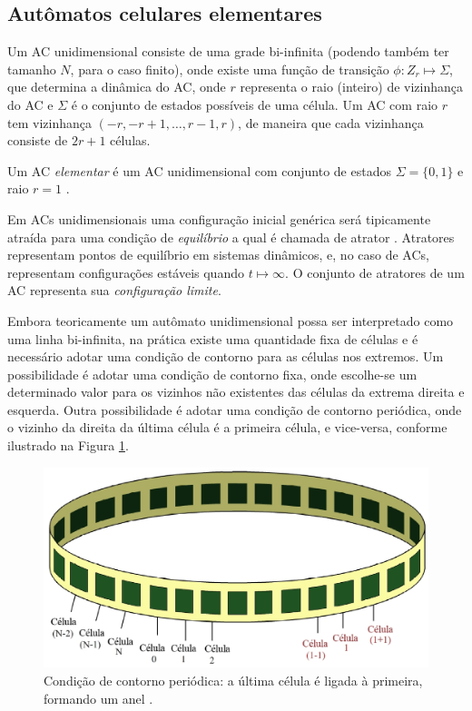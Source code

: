 \documentclass[12pt,a4paper]{article}
\begin{document}
\subsection{Autômatos celulares elementares}

Um AC unidimensional consiste de uma grade bi-infinita (podendo também ter tamanho
$N$, para o caso finito), onde existe uma função de transição $\phi: Z_r \mapsto \Sigma$,
que determina a dinâmica do AC, onde $r$ representa o raio (inteiro) de vizinhança do AC e
$\Sigma$ é o conjunto de estados possíveis de uma célula. Um AC com raio $r$ tem
vizinhança $(-r,-r+1,\ldots,r-1,r)$, de maneira que cada vizinhança consiste
de $2r+1$ células.

Um AC \textit{elementar} é um AC unidimensional com conjunto de estados
$\Sigma = \{0,1\}$ e raio $r=1$ .

Em ACs unidimensionais uma configuração inicial genérica será tipicamente atraída
para uma condição de \textit{equilíbrio} a qual é chamada de atrator .
Atratores representam pontos de equilíbrio em sistemas dinâmicos, e, no caso de ACs,
representam configurações estáveis quando $t \mapsto \infty$. O conjunto de atratores
de um AC representa sua \textit{configuração limite}.

Embora teoricamente um autômato unidimensional possa ser interpretado como uma linha bi-infinita,
na prática existe uma quantidade fixa de células e é necessário adotar uma condição de contorno
para as células nos extremos. Um possibilidade é adotar uma condição de contorno fixa, onde
escolhe-se um determinado valor para os vizinhos não existentes das células da extrema direita
e esquerda. Outra possibilidade é adotar uma condição de contorno periódica, onde o vizinho
da direita da última célula é a primeira célula, e vice-versa, conforme ilustrado na Figura
\ref{fig:ring}.

\begin{figure}[htp]
\begin{center}
\includegraphics[scale=0.3]{img/ring.eps}
\caption[Condição de contorno periódica]{Condição de contorno periódica:
a última célula é ligada à primeira, formando um anel
.}
\label{fig:ring}
\end{center}
\end{figure}
\end{document}

